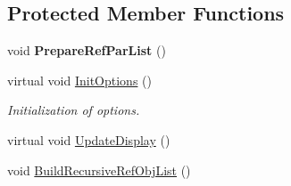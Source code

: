 \subsection*{Protected Member Functions}
\begin{DoxyCompactItemize}
\item 
\mbox{\label{class_obj_cryst_1_1_optimization_obj_a2f11f520bc1bd0b70f8aea98d3f8224c}} 
void {\bfseries Prepare\+Ref\+Par\+List} ()
\item 
\mbox{\label{class_obj_cryst_1_1_optimization_obj_a8f0a96403105e92b54ae2e6ba55d24e1}} 
virtual void \mbox{\hyperlink{class_obj_cryst_1_1_optimization_obj_a8f0a96403105e92b54ae2e6ba55d24e1}{Init\+Options}} ()
\begin{DoxyCompactList}\small\item\em Initialization of options. \end{DoxyCompactList}\item 
virtual void \mbox{\hyperlink{class_obj_cryst_1_1_optimization_obj_a6c353da1d31c049c2ad08a5503d5380b}{Update\+Display}} ()
\item 
void \mbox{\hyperlink{class_obj_cryst_1_1_optimization_obj_a7c819c5f8fc52caafd97ea9d468da2be}{Build\+Recursive\+Ref\+Obj\+List}} ()
\end{DoxyCompactItemize}
